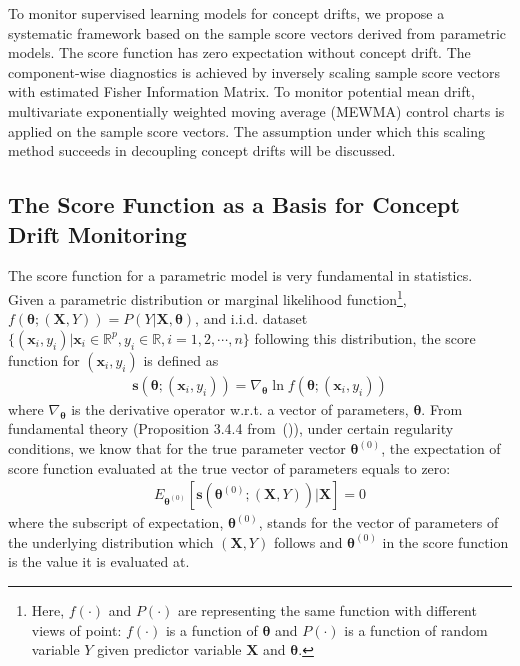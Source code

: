 \documentclass[twoside,11pt]{article}
\begin{document}
To {monitor supervised learning models for} concept {drifts}, we propose a systematic framework based on the sample score vectors derived from parametric models. The score function {has} zero expectation without concept drift. The component-wise {diagnostics} is achieved by inversely scaling sample score vectors with estimated Fisher Information Matrix. To monitor potential mean drift, {multivariate} exponentially weighted moving average {(MEWMA)} control charts is applied on the sample score vectors. The assumption under which this scaling method succeeds in decoupling concept drifts will be discussed.

\subsection{The Score Function as a Basis for Concept Drift Monitoring}
\label{ss:score_func}

The score function for a parametric model is very fundamental in statistics. Given a parametric distribution or {marginal} likelihood function\footnote{Here, $f(\cdot)$ and $P(\cdot)$ are representing the same function with different views of point: $f (\cdot)$ is a function of $\bm { \theta}$ and $P (\cdot)$ is a function of random variable $Y$ given predictor variable $\bm {X}$ and $\bm { \theta}$.}, {$f(\bm{\theta}; (\bm {X}, Y))=P(Y | \bm {X}, \bm{\theta})$}, and i.i.d. dataset $\{(\bm {x}_i, y_i) | \bm {x}_i\in \mathbb{R}^p, y_i\in\mathbb{R}, i = 1,2, \cdots, n\}$ following this distribution, the score function for $ (\bm {x}_i, y_i)$ is defined as 
\begin{align}
\bm{s}(\bm { \theta}; (\bm {x}_i, y_i)) = \nabla _{\bm { \theta}} { \ln f(\bm{\theta}; (\bm {x}_i, y_i))}
\label{eqn:score_func}
\end{align}
where $\nabla _{\bm { \theta}}$ is the derivative operator w.r.t. a vector of parameters, $\bm {\theta}$. From fundamental theory (Proposition 3.4.4 from~(\cite{bickel2015mathematical})), under certain regularity conditions, we know that for the true parameter vector {$\bm { \theta} ^{ (0)}$}, the expectation of score function evaluated at the true vector of parameters equals to zero: 
\begin{align}
E_{\bm { \theta} ^{ (0)}}[\bm{s}(\bm { \theta}^{ (0)};(\bm {X}, Y))|\bm {X}] = 0
\label{eqn:score_exp_zero}
\end{align}
where the subscript of expectation, $\bm { \theta} ^{ (0)}$, stands for the vector of parameters of the underlying distribution which $(\bm {X}, Y)$ follows and $\bm { \theta} ^{(0)}$ in the score function is the value it is evaluated at.
\end{document}

